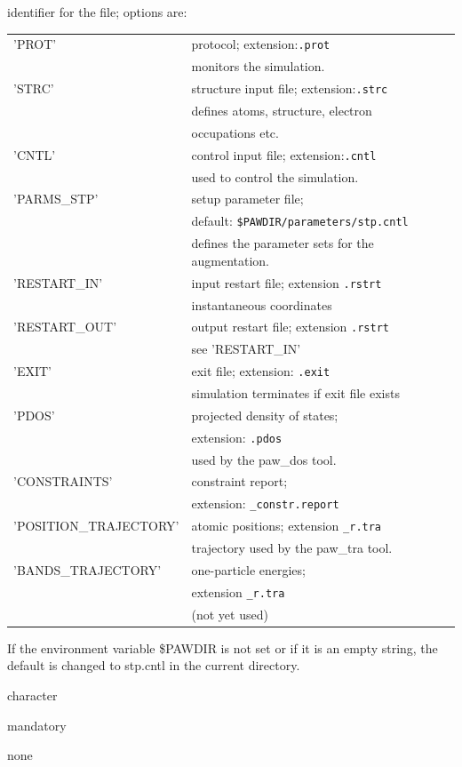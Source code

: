 \documentclass[final,12pt]{article}
\newcommand{\key}[1]{\hfill\break \makebox[1.5in][l]{\bf #1}\hfill\break}
\newcommand{\vdescr}[1]{\makebox[1in][l]{}\parbox[t]{110mm}{#1}\hfill\break}
\newcommand{\vformat}[1]{
\makebox[1in][l]{}\parbox[t]{110mm}{\makebox[1in][l]{Type:}\parbox[t]{2.7in}{#1}}
\hfill\break}
\newcommand{\vrules}[1]{
\makebox[1in][l]{}\parbox[t]{110mm}{\makebox[1in][l]{Rules:}\parbox[t]{2.7in}{#1}}
\hfill\break}
\newcommand{\vdefault}[1]{
\makebox[1in][l]{}\parbox[t]{110mm}
{\makebox[1in][l]{Default:}\parbox[t]{2.7in}{#1}}
\hfill\break}
\newcommand{\mbax}[1]{#1}
\begin{document}
\newpage
\mbax{\key{ID}
\vdescr{identifier for the file; options are:\hfill\break 
\noindent
\begin{tabular}{|l|l|}
\hline
'PROT'& protocol; extension:{\tt .prot}\\
&monitors the simulation.\\
\hline
'STRC'& structure input file; extension:{\tt .strc}\\
& defines atoms, structure, electron \\
&occupations etc.\\
\hline
'CNTL'& control input file; extension:{\tt .cntl}\\
&used to control the simulation.\\
\hline
'PARMS\_STP'& setup parameter file; \\
&default: {\tt \$PAWDIR/parameters/stp.cntl}\\
&defines the parameter sets for the augmentation.\\
\hline
'RESTART\_IN'& input restart file; extension {\tt .rstrt}\\
&instantaneous coordinates\\
\hline
'RESTART\_OUT'& output restart file; extension {\tt .rstrt}\\
&see 'RESTART\_IN'\\
\hline
'EXIT'& exit file; extension: {\tt .exit}\\
& simulation terminates if exit file exists\\
\hline
'PDOS'& projected density of states;\\
& extension: {\tt .pdos}\\
& used by the paw\_dos tool.\\
\hline
'CONSTRAINTS'& constraint report;\\
& extension: {\tt \_constr.report}\\
\hline
'POSITION\_TRAJECTORY'& atomic positions; 
extension {\tt \_r.tra}\\
&trajectory used by the paw\_tra tool.\\
\hline
'BANDS\_TRAJECTORY'& one-particle energies;\\
&extension {\tt \_r.tra}\\
&(not yet used)\\
\hline
\end{tabular}
If the environment variable \$PAWDIR is not set or if it is an 
empty string, the default is changed to stp.cntl in the current directory.
}
\vformat{character} 
\vrules{mandatory}
\vdefault{none}}
\end{document}
